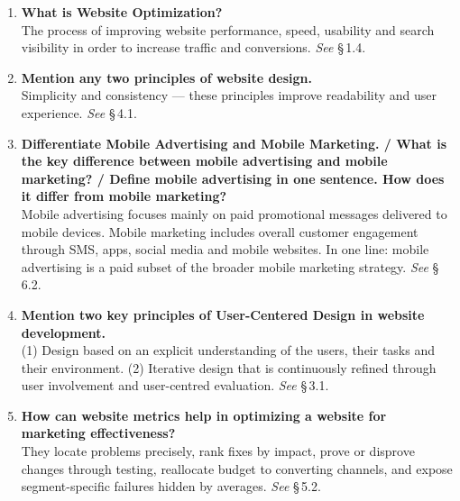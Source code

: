 \begin{enumerate}[leftmargin=2.2em,itemsep=1.1ex]

\item \textbf{What is Website Optimization?} \\
      The process of improving website performance, speed, usability and search
      visibility in order to increase traffic and conversions.
      \hfill\emph{See} \S\,1.4.

\item \textbf{Mention any two principles of website design.}
      \\
      Simplicity and consistency --- these principles improve readability and user
      experience. \hfill\emph{See} \S\,4.1.

\item \textbf{Differentiate Mobile Advertising and Mobile Marketing. / What is the
      key difference between mobile advertising and mobile marketing? / Define
      mobile advertising in one sentence. How does it differ from mobile
      marketing?}
      \\
      Mobile advertising focuses mainly on paid promotional messages delivered to
      mobile devices. Mobile marketing includes overall customer engagement
      through SMS, apps, social media and mobile websites. In one line: mobile
      advertising is a paid subset of the broader mobile marketing strategy.
      \hfill\emph{See} \S\,6.2.

\item \textbf{Mention two key principles of User-Centered Design in website
      development.} \\
      (1) Design based on an explicit understanding of the users, their tasks and
      their environment. (2) Iterative design that is continuously refined
      through user involvement and user-centred evaluation.
      \hfill\emph{See} \S\,3.1.

\item \textbf{How can website metrics help in optimizing a website for marketing
      effectiveness?} \\
      They locate problems precisely, rank fixes by impact, prove or disprove
      changes through testing, reallocate budget to converting channels, and
      expose segment-specific failures hidden by averages.
      \hfill\emph{See} \S\,5.2.


\end{enumerate}
